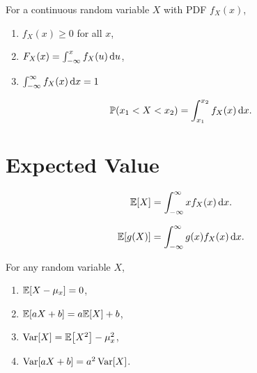 \begin{theorem}
    For a continuous random variable $X$ with PDF $f_X(x)$,
    \begin{enumerate}
        \item $f_X(x)\geq 0$ for all $x$,
        \item $F_X(x)=\int_{-\infty}^x f_X(u)\,\mathrm{d} u$,
        \item $\int_{-\infty}^{\infty} f_X(x)\,\mathrm{d} x = 1$
    \end{enumerate}
\end{theorem}

\begin{theorem}
    \begin{align*}
        \P{x_1<X<x_2}=\int_{x_1}^{x_2}f_X(x)\diff x.
    \end{align*}
\end{theorem}


\section{Expected Value}
\begin{definition}
    \begin{align*}
        \E{X}=\int_{-\infty}^{\infty} xf_X(x) \diff x.
    \end{align*}
\end{definition}

\begin{theorem}
    \begin{align*}
        \E{g(X)} = \int_{-\infty}^{\infty} g(x)f_X(x)\diff x.
    \end{align*}
\end{theorem}

\begin{theorem}
    For any random variable $X$,
    \begin{enumerate}
        \item $\E{X-\mu_x}=0$,
        \item $\E{aX+b}=a\E{X}+b$,
        \item $\Var[X] = \E{X^2}-\mu_x^2$,
        \item $\mathop{\mathrm{Var}}\nolimits[aX+b]=a^2\mathop{\mathrm{Var}}\nolimits[X]$.
    \end{enumerate}
\end{theorem}

